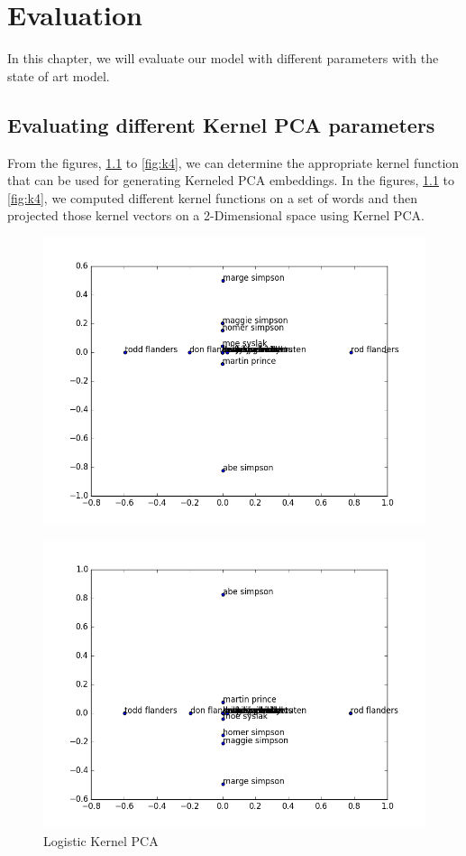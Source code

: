 \chapter{Evaluation}
\label{cha:eval}
In this chapter, we will evaluate our model with different parameters with the state of art model.
\section{Evaluating different Kernel PCA parameters}
From the figures, \ref{fig:k1} to \ref{fig:k4}, we can determine the appropriate kernel function that can be used for generating Kerneled PCA embeddings. In the figures, \ref{fig:k1} to \ref{fig:k4}, we computed different kernel functions on a set of words and then projected those kernel vectors on a 2-Dimensional space using Kernel PCA.
\begin{figure}[H]
	\begin{minipage}[b]{0.5\linewidth}
		\centering
		\includegraphics[width=1\linewidth]{files//KERNELPCA/log.png} 
		\caption{Logistic Kernel PCA} 
		\vspace{4ex}\label{fig:k1}
	\end{minipage}%
	\begin{minipage}[b]{0.5\linewidth}
		\centering
		\includegraphics[width=1\linewidth]{files//KERNELPCA/cos.png} 

\end{minipage}
\end{figure}
